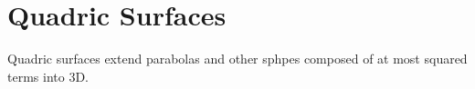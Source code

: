 \section{Quadric Surfaces}
\noindent
Quadric surfaces extend parabolas and other sphpes composed of at most squared terms into 3D.





